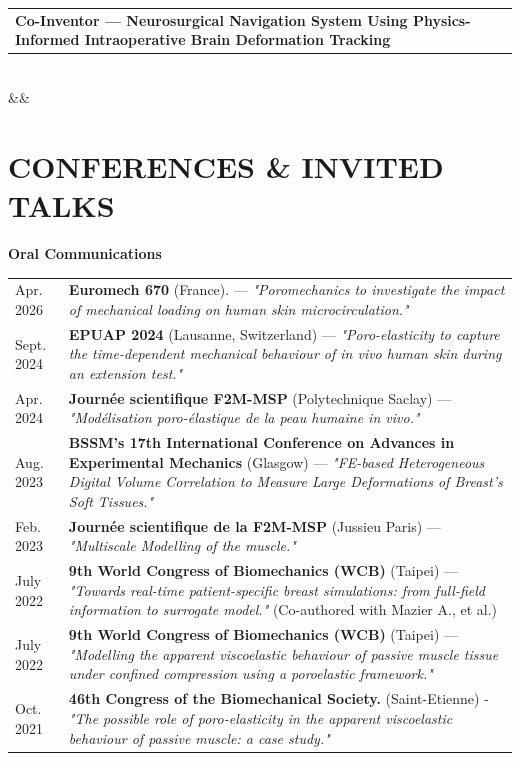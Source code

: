 \documentclass[10pt, a4paper]{article}
\makeatletter
\newcommand{\cventry}[4]{%
  \noindent
  \begin{tabularx}{\linewidth}{@{}Xr@{}}
    {\fontsize{11.5}{12.5}\selectfont\textbf{#1}} & \textcolor{medgray}{#2}
  \end{tabularx}\\[0pt]
  \noindent{\textit{\textcolor{darkgray}{#3}}}
  \vspace{-4pt}
  \ifx&#4&\else
    \begin{itemize}#4\end{itemize}
  \fi
  \vspace{3pt}
}
\makeatother
\begin{document}
\cventry{Co-Inventor — Neurosurgical Navigation System Using Physics-Informed Intraoperative Brain Deformation Tracking}{}%
{Application Number: LU509777 (Luxembourg) — Status: Pending}{}

\newpage
\section{CONFERENCES \& INVITED TALKS}

\noindent\textbf{Oral Communications}

\noindent
\begin{tabularx}{\linewidth}{lX}
  Apr. 2026 & \textbf{Euromech 670} (France). — \textit{"Poromechanics to investigate the impact of mechanical loading on human skin microcirculation."} \\
  Sept. 2024 & \textbf{EPUAP 2024} (Lausanne, Switzerland) — \textit{"Poro-elasticity to capture the time-dependent mechanical behaviour of in vivo human skin during an extension test."} \\
  Apr. 2024 & \textbf{Journée scientifique F2M-MSP} (Polytechnique Saclay) — \textit{"Modélisation poro-élastique de la peau humaine in vivo."} \\
  Aug. 2023 & \textbf{BSSM's 17th International Conference on Advances in Experimental Mechanics} (Glasgow) — \textit{"FE-based Heterogeneous Digital Volume Correlation to Measure Large Deformations of Breast's Soft Tissues."} \\
  Feb. 2023 & \textbf{Journée scientifique de la F2M-MSP} (Jussieu Paris) — \textit{"Multiscale Modelling of the muscle."} \\
  July 2022 & \textbf{9th World Congress of Biomechanics (WCB)} (Taipei) — \textit{"Towards real-time patient-specific breast simulations: from full-field information to surrogate model."} (Co-authored with Mazier A., et al.) \\
  July 2022 & \textbf{9th World Congress of Biomechanics (WCB)} (Taipei) — \textit{"Modelling the apparent viscoelastic behaviour of passive muscle tissue under confined compression using a poroelastic framework."} \\
  Oct. 2021 & \textbf{46th Congress of the Biomechanical Society.} (Saint-Etienne) - \textit{"The possible role of poro-elasticity in the apparent viscoelastic behaviour of passive muscle: a case study."} \\
\end{tabularx}
\end{document}
